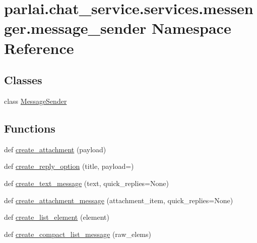 \hypertarget{namespaceparlai_1_1chat__service_1_1services_1_1messenger_1_1message__sender}{}\section{parlai.\+chat\+\_\+service.\+services.\+messenger.\+message\+\_\+sender Namespace Reference}
\label{namespaceparlai_1_1chat__service_1_1services_1_1messenger_1_1message__sender}
\subsection*{Classes}
\begin{DoxyCompactItemize}
\item 
class \hyperlink{classparlai_1_1chat__service_1_1services_1_1messenger_1_1message__sender_1_1MessageSender}{Message\+Sender}
\end{DoxyCompactItemize}
\subsection*{Functions}
\begin{DoxyCompactItemize}
\item 
def \hyperlink{namespaceparlai_1_1chat__service_1_1services_1_1messenger_1_1message__sender_a8303c44a600b84c0d42770128be13e9a}{create\+\_\+attachment} (payload)
\item 
def \hyperlink{namespaceparlai_1_1chat__service_1_1services_1_1messenger_1_1message__sender_a895e006007913ad0fde9c2c9bf9ec5a5}{create\+\_\+reply\+\_\+option} (title, payload=\textquotesingle{}\textquotesingle{})
\item 
def \hyperlink{namespaceparlai_1_1chat__service_1_1services_1_1messenger_1_1message__sender_a4c32dfd7947a473a730b81e9356e3513}{create\+\_\+text\+\_\+message} (text, quick\+\_\+replies=None)
\item 
def \hyperlink{namespaceparlai_1_1chat__service_1_1services_1_1messenger_1_1message__sender_a2b2d0c5879079ba1320a7ed62893d7de}{create\+\_\+attachment\+\_\+message} (attachment\+\_\+item, quick\+\_\+replies=None)
\item 
def \hyperlink{namespaceparlai_1_1chat__service_1_1services_1_1messenger_1_1message__sender_a25b4cf40191d466edc7f8da108326f8c}{create\+\_\+list\+\_\+element} (element)
\item 
def \hyperlink{namespaceparlai_1_1chat__service_1_1services_1_1messenger_1_1message__sender_aad605cb9ba870a032f7b09775bebabb1}{create\+\_\+compact\+\_\+list\+\_\+message} (raw\+\_\+elems)
\end{DoxyCompactItemize}
